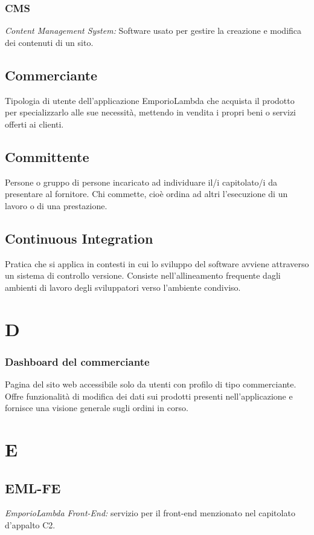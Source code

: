 \subsubsection*{CMS}
\textit{Content Management System:} Software usato per gestire la creazione e modifica dei contenuti di un sito.

\subsection*{Commerciante}
Tipologia di utente dell'applicazione EmporioLambda che acquista il prodotto per specializzarlo
alle sue necessità, mettendo in vendita i propri beni o servizi offerti ai clienti.

\subsection*{Committente}
Persone o gruppo di persone incaricato ad individuare il/i capitolato/i da presentare al fornitore.
Chi commette, cioè ordina ad altri l'esecuzione di un lavoro o di una prestazione.

\subsection*{Continuous Integration}
Pratica che si applica in contesti in cui lo sviluppo del software avviene attraverso un sistema di controllo versione. Consiste nell'allineamento frequente dagli ambienti di lavoro degli sviluppatori verso l'ambiente condiviso.

\section*{D}
\subsubsection*{Dashboard del commerciante}
Pagina del sito web accessibile solo da utenti con profilo di tipo commerciante. Offre funzionalità di modifica dei dati sui prodotti
presenti nell'applicazione e fornisce una visione generale sugli ordini in corso.

\section*{E}
\subsection*{EML-FE}
\textit{EmporioLambda Front-End:} servizio per il front-end menzionato nel capitolato d'appalto C2.


